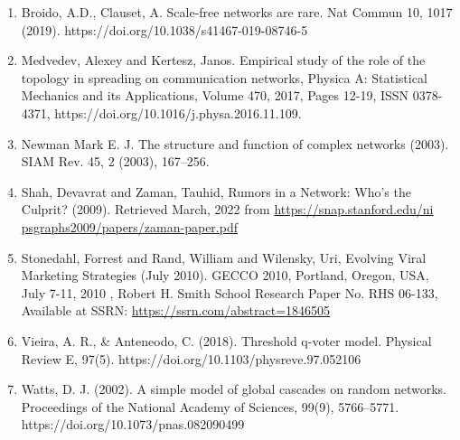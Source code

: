 \documentclass{article}
\begin{document}
\begin{enumerate}
    \item Broido, A.D., Clauset, A. Scale-free networks are rare. Nat Commun 10, 1017 (2019). https://doi.org/10.1038/s41467-019-08746-5
    
    \item Medvedev, Alexey and Kertesz, Janos. Empirical study of the role of the topology in spreading on communication networks, Physica A: Statistical Mechanics and its Applications, Volume 470, 2017, Pages 12-19, ISSN 0378-4371, https://doi.org/10.1016/j.physa.2016.11.109.

    \item Newman Mark E. J.  The structure and function of complex networks (2003). SIAM Rev. 45, 2 (2003), 167–256. 
    
    \item Shah, Devavrat and Zaman, Tauhid, Rumors in a Network: Who’s the Culprit? (2009). Retrieved March, 2022 from \href{https://snap.stanford.edu/nipsgraphs2009/papers/zaman-paper.pdf}{https://snap.stanford.edu/ni psgraphs2009/papers/zaman-paper.pdf}
    
    \item Stonedahl, Forrest and Rand, William and Wilensky, Uri, Evolving Viral Marketing Strategies (July 2010). GECCO 2010, Portland, Oregon, USA, July 7-11, 2010 , Robert H. Smith School Research Paper No. RHS 06-133, Available at SSRN: \url{https://ssrn.com/abstract=1846505}

    \item Vieira, A. R., & Anteneodo, C. (2018). Threshold q-voter model. Physical Review E, 97(5). https://doi.org/10.1103/physreve.97.052106
    
    \item Watts, D. J. (2002). A simple model of global cascades on random networks. Proceedings of the National Academy of Sciences, 99(9), 5766–5771. https://doi.org/10.1073/pnas.082090499
\end{enumerate}
\end{document}
